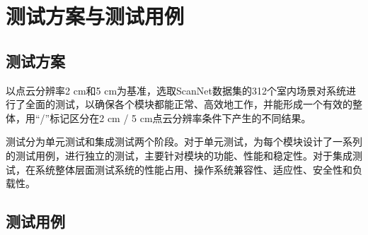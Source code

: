 \section{测试方案与测试用例}

\subsection{测试方案}
\par 以点云分辨率2 cm和5 cm为基准，选取ScanNet数据集\cite{scannet}的312个室内场景对系统进行了全面的测试，以确保各个模块都能正常、高效地工作，并能形成一个有效的整体，用“/”标记区分在2 cm / 5 cm点云分辨率条件下产生的不同结果。
\par 测试分为单元测试和集成测试两个阶段。对于单元测试，为每个模块设计了一系列的测试用例，进行独立的测试，主要针对模块的功能、性能和稳定性。对于集成测试，在系统整体层面测试系统的性能占用、操作系统兼容性、适应性、安全性和负载性。

\subsection{测试用例}

